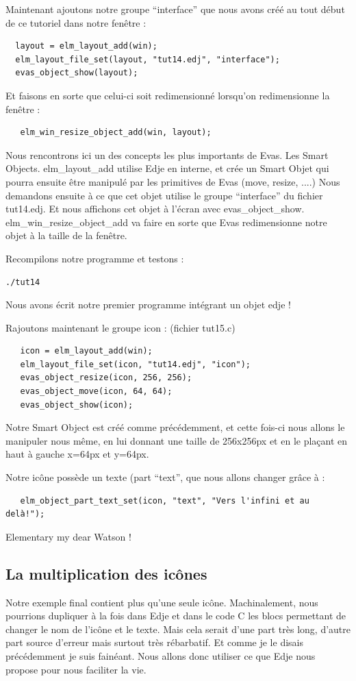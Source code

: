 \documentclass[a4paper]{efr}
\begin{document}
Maintenant ajoutons notre groupe ``interface'' que nous avons créé au tout
début de ce tutoriel dans notre fenêtre :

\begin{lstlisting}
  layout = elm_layout_add(win);
  elm_layout_file_set(layout, "tut14.edj", "interface");
  evas_object_show(layout);
\end{lstlisting}

Et faisons en sorte que celui-ci soit redimensionné lorsqu'on redimensionne la
fenêtre :
\begin{lstlisting}
   elm_win_resize_object_add(win, layout);
\end{lstlisting}

Nous rencontrons ici un des concepts les plus importants de Evas. Les Smart
Objects. elm\_layout\_add utilise Edje en interne, et crée un Smart Objet qui
pourra ensuite être manipulé par les primitives de Evas (move, resize, ....)
Nous demandons ensuite à ce que cet objet utilise le groupe ``interface'' du
fichier tut14.edj. Et nous affichons cet objet à l'écran avec
evas\_object\_show. elm\_win\_resize\_object\_add va faire en sorte que Evas
redimensionne notre objet à la taille de la fenêtre.

Recompilons notre programme et testons :
\begin{lstlisting}
./tut14
\end{lstlisting}

Nous avons écrit notre premier programme intégrant un objet edje !

Rajoutons maintenant le groupe icon : (fichier tut15.c)
\begin{lstlisting}
   icon = elm_layout_add(win);
   elm_layout_file_set(icon, "tut14.edj", "icon");
   evas_object_resize(icon, 256, 256);
   evas_object_move(icon, 64, 64);
   evas_object_show(icon);
\end{lstlisting}

Notre Smart Object est créé comme précédemment, et cette fois-ci nous allons
le manipuler nous même, en lui donnant une taille de 256x256px et en le
plaçant en haut à gauche x=64px et y=64px.

Notre icône possède un texte (part ``text'', que nous allons changer grâce à :
\begin{lstlisting}
   elm_object_part_text_set(icon, "text", "Vers l'infini et au delà!");
\end{lstlisting}

Elementary my dear Watson !

\subsection{La multiplication des icônes}
Notre exemple final contient plus qu'une seule icône. Machinalement, nous
pourrions dupliquer à la fois dans Edje et dans le code C les blocs permettant
de changer le nom de l'icône et le texte. Mais cela serait d'une part très long,
d'autre part source d'erreur mais surtout très rébarbatif. Et comme je le disais précédemment
je suis fainéant. Nous allons donc utiliser ce que Edje nous propose pour nous
faciliter la vie.
\end{document}
